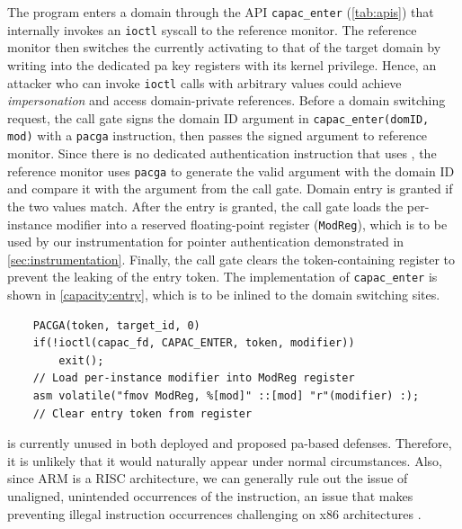 \label{sec:design:libcapac}
\label{sec:design:switch-auth} %
The program enters a domain through the API \texttt{capac\_enter} (\autoref{tab:apis}) that internally invokes an \texttt{ioctl} syscall to the reference monitor.
The reference monitor then switches the currently activating  to that of the target domain by writing into the dedicated \gls{pa} key registers with its kernel privilege. Hence, an attacker who can invoke \texttt{ioctl} calls with arbitrary values could achieve \emph{impersonation} and access domain-private references.
Before a domain switching request, the call gate signs the domain ID argument in \texttt{capac\_enter(domID, mod)} with a \texttt{pacga} instruction, then passes the signed argument to \thename reference monitor.
Since there is no dedicated authentication instruction that uses , the reference monitor uses \texttt{pacga} to generate the valid argument with the domain ID and compare it with the argument from the call gate. Domain entry is granted if the two values match.
After the entry is granted, the call gate loads the per-instance modifier into a reserved floating-point register (\texttt{ModReg}), which is to be used by our instrumentation for pointer authentication demonstrated in \cref{sec:instrumentation}.
Finally, the call gate clears the token-containing register to prevent the leaking of the entry token.
The implementation of \texttt{capac\_enter} is shown in \autoref{capacity:entry}, which is to be inlined to the domain switching sites.

\begin{listing}[h]
	\begin{verbatim}
    PACGA(token, target_id, 0)
    if(!ioctl(capac_fd, CAPAC_ENTER, token, modifier)) 
        exit();
    // Load per-instance modifier into ModReg register
    asm volatile("fmov ModReg, %[mod]" ::[mod] "r"(modifier) :);  
    // Clear entry token from register
\end{verbatim}
	\caption{\thename domain entry gate}\label{capacity:entry}

\end{listing}

 is currently unused in both deployed and proposed \gls{pa}-based defenses.
Therefore, it is unlikely that it would naturally appear under normal circumstances.
Also, since ARM is a RISC architecture, we can generally rule out the issue of unaligned, unintended occurrences of the instruction, an issue that makes preventing illegal instruction occurrences challenging on x86 architectures \cite{erim}.

